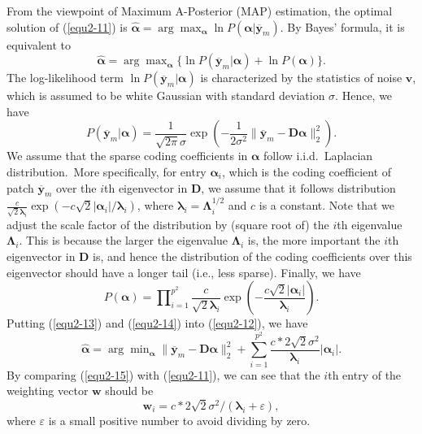 From the viewpoint of Maximum A-Posterior (MAP) estimation, the optimal solution of (\ref{equ2-11}) is $\hat{\bm{\alpha}} = \arg\max\nolimits_{\bm{\alpha}}\ln P(\bm{\alpha}|\bm{\overline{y}}_{m})$. By Bayes' formula, it is equivalent to
\begin{equation}
\label{equ2-12}
\hat{\bm{\alpha}} = \arg\max\nolimits_{\bm{\alpha}}\{\ln P(\bm{\overline{y}}_{m}|\bm{\alpha})+\ln P(\bm{\alpha})\}.
\end{equation}
The log-likelihood term $\ln P(\bm{\overline{y}}_{m}|\bm{\alpha})$ is characterized by the statistics of noise $\bm{v}$, which is assumed to be white Gaussian with standard deviation $\sigma$. Hence, we have
\begin{equation}
\label{equ2-13}
P(\bm{\overline{y}}_{m}|\bm{\alpha}) = \frac{1}{\sqrt{2\pi}\sigma}\exp(-\frac{1}{2\sigma^{2}}\|\bm{\overline{y}}_{m}-\bm{D}\bm{\alpha}\|_{2}^{2}).
\end{equation}
We assume that the sparse coding coefficients in $\bm{\alpha}$ follow i.i.d.\ Laplacian distribution.\ More specifically, for entry $\bm{\alpha}_{i}$, which is the coding coefficient of patch $\bm{\overline{y}}_{m}$ over the $i$th eigenvector in $\bm{D}$, we assume that it follows distribution $\frac{c}{\sqrt{2}\bm{\lambda}_{i}}\exp(-c\sqrt{2}|\bm{\alpha}_{i}|/\bm{\lambda}_{i})$, where $\bm{\lambda}_{i}=\bm{\Lambda}_{i}^{1/2}$ and $c$ is a constant. Note that we adjust the scale factor of the distribution by (square root of) the $i$th eigenvalue $\bm{\Lambda}_{i}$. This is because the larger the eigenvalue $\bm{\Lambda}_{i}$ is, the more important the $i$th eigenvector in $\bm{D}$ is, and hence the distribution of the coding coefficients over this eigenvector should have a longer tail (i.e., less sparse). Finally, we have
\begin{equation}
\label{equ2-14}
P(\bm{\alpha})=\prod\nolimits_{i=1}^{p^{2}}\frac{c}{\sqrt{2}\bm{\lambda}_{i}}\exp(-\frac{c\sqrt{2}|\bm{\alpha}_{i}|}{\bm{\lambda}_{i}}).
\end{equation}
Putting (\ref{equ2-13}) and (\ref{equ2-14}) into (\ref{equ2-12}), we have
\begin{equation}\label{equ2-15}
\hat{\bm{\alpha}}=\arg\min\nolimits_{\bm{\alpha}}\|\bm{\overline{y}}_{m}-\bm{D}\bm{\alpha}\|_{2}^{2}+\sum_{i=1}^{p^{2}}\frac{c*2\sqrt{2}\sigma^{2}}{\bm{\lambda}_{i}}|\bm{\alpha}_{i}|.
\end{equation}
By comparing (\ref{equ2-15}) with (\ref{equ2-11}), we can see that the $i$th entry of the weighting vector $\bm{w}$ should be
\begin{equation}\label{equ2-16}
\bm{w}_{i} = c*2\sqrt{2}\sigma^{2}/(\bm{\lambda}_{i}+\varepsilon),
\end{equation}
where $\varepsilon$ is a small positive number to avoid dividing by zero.

